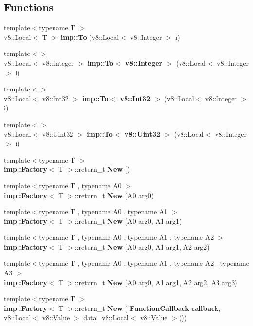 \subsection*{Functions}
\begin{DoxyCompactItemize}
\item 
{\footnotesize template$<$typename T $>$ }\\v8\+::\+Local$<$ T $>$ \textbf{ imp\+::\+To} (v8\+::\+Local$<$ v8\+::\+Integer $>$ i)
\item 
{\footnotesize template$<$$>$ }\\v8\+::\+Local$<$ v8\+::\+Integer $>$ \textbf{ imp\+::\+To$<$ v8\+::\+Integer $>$} (v8\+::\+Local$<$ v8\+::\+Integer $>$ i)
\item 
{\footnotesize template$<$$>$ }\\v8\+::\+Local$<$ v8\+::\+Int32 $>$ \textbf{ imp\+::\+To$<$ v8\+::\+Int32 $>$} (v8\+::\+Local$<$ v8\+::\+Integer $>$ i)
\item 
{\footnotesize template$<$$>$ }\\v8\+::\+Local$<$ v8\+::\+Uint32 $>$ \textbf{ imp\+::\+To$<$ v8\+::\+Uint32 $>$} (v8\+::\+Local$<$ v8\+::\+Integer $>$ i)
\item 
{\footnotesize template$<$typename T $>$ }\\\textbf{ imp\+::\+Factory}$<$ T $>$\+::return\+\_\+t \textbf{ New} ()
\item 
{\footnotesize template$<$typename T , typename A0 $>$ }\\\textbf{ imp\+::\+Factory}$<$ T $>$\+::return\+\_\+t \textbf{ New} (A0 arg0)
\item 
{\footnotesize template$<$typename T , typename A0 , typename A1 $>$ }\\\textbf{ imp\+::\+Factory}$<$ T $>$\+::return\+\_\+t \textbf{ New} (A0 arg0, A1 arg1)
\item 
{\footnotesize template$<$typename T , typename A0 , typename A1 , typename A2 $>$ }\\\textbf{ imp\+::\+Factory}$<$ T $>$\+::return\+\_\+t \textbf{ New} (A0 arg0, A1 arg1, A2 arg2)
\item 
{\footnotesize template$<$typename T , typename A0 , typename A1 , typename A2 , typename A3 $>$ }\\\textbf{ imp\+::\+Factory}$<$ T $>$\+::return\+\_\+t \textbf{ New} (A0 arg0, A1 arg1, A2 arg2, A3 arg3)
\item 
{\footnotesize template$<$typename T $>$ }\\\textbf{ imp\+::\+Factory}$<$ T $>$\+::return\+\_\+t \textbf{ New} (\textbf{ Function\+Callback} \textbf{ callback}, v8\+::\+Local$<$ v8\+::\+Value $>$ data=v8\+::\+Local$<$ v8\+::\+Value $>$())

\end{DoxyCompactItemize}
